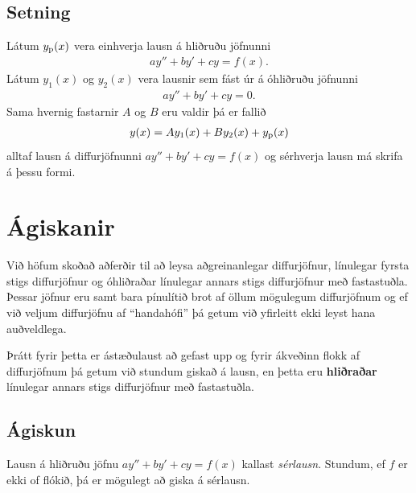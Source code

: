 \documentclass[a4paper,10pt,icelandic]{sphinxmanual}
\begin{document}
\subsection{Setning}
\label{kafli08:id4}
Látum \(y_{\rm p}(x)\) vera einhverja lausn á hliðruðu jöfnunni
\begin{equation*}
\begin{split}ay''+by'+cy=f(x).\end{split}
\end{equation*}
Látum \(y_1(x)\) og \(y_2(x)\) vera lausnir sem fást úr {\hyperref[kafli08:stigs\string-ohlidrud]{}} á
óhliðruðu jöfnunni
\begin{equation*}
\begin{split}ay''+by'+cy=0.\end{split}
\end{equation*}
Sama hvernig fastarnir \(A\) og \(B\) eru valdir þá er fallið
\begin{equation*}
\begin{split}y(x)=Ay_1(x)+By_2(x)+y_{\rm p}(x)\end{split}
\end{equation*}
alltaf lausn á diffurjöfnunni \(ay''+by'+cy=f(x)\) og sérhverja
lausn má skrifa á þessu formi.


\section{Ágiskanir}
\label{kafli08:agiskanir}
Við höfum skoðað aðferðir til að leysa aðgreinanlegar diffurjöfnur,
línulegar fyrsta stigs diffurjöfnur og óhliðraðar línulegar
annars stigs diffurjöfnur með fastastuðla. Þessar jöfnur eru
samt bara pínulítið brot af öllum mögulegum diffurjöfnum og ef við
veljum diffurjöfnu af ``handahófi'' þá getum við yfirleitt ekki
leyst hana auðveldlega.

Þrátt fyrir þetta er ástæðulaust að gefast upp og fyrir ákveðinn flokk
af diffurjöfnum þá getum við stundum giskað á lausn, en þetta eru
\textbf{hliðraðar} línulegar annars stigs diffurjöfnur með fastastuðla.


\subsection{Ágiskun}
\label{kafli08:agiskun}\label{kafli08:id5}\label{kafli08:index-7}
Lausn á hliðruðu jöfnu \(ay''+by'+cy=f(x)\) kallast \emph{sérlausn}.
Stundum, ef \(f\) er ekki of flókið, þá er mögulegt að giska á sérlausn.
\end{document}
